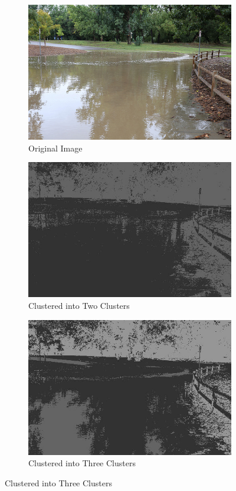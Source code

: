 \documentclass[12pt]{article}
\begin{document}
	\begin{figure}
	\begin{subfigure}{.33\textwidth}
	  \centering
	  \includegraphics[width=.9\linewidth]{./images/clustering/9731928435_8f83f7253e.png}
	  \caption{Original Image}
	\end{subfigure}%
	\begin{subfigure}{.33\textwidth}
	  \centering
	  \includegraphics[width=.9\linewidth]{./images/clustering/image_23.jpg}
	  \caption{Clustered into Two Clusters}
	\end{subfigure}%
	\begin{subfigure}{.33\textwidth}
	  \centering
	  \includegraphics[width=.9\linewidth]{./images/clustering/image_32.jpg}
	  \caption{Clustered into Three Clusters}
	\end{subfigure}%
	\end{figure}
	
\end{document}
